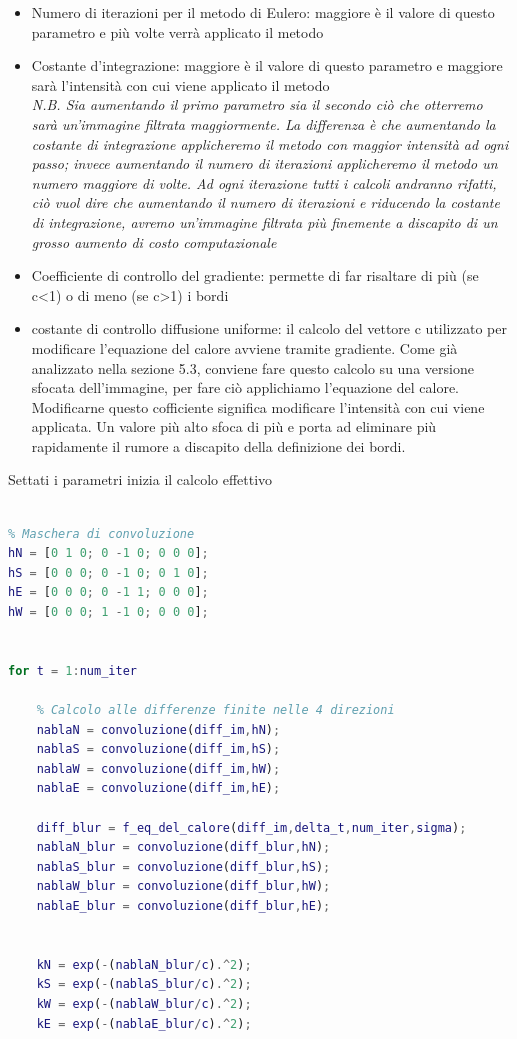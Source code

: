 \begin{itemize}
    \item Numero di iterazioni per il metodo di Eulero: maggiore è il valore di questo parametro e più volte verrà applicato il metodo
    \item Costante d'integrazione: maggiore è il valore di questo parametro e maggiore sarà l'intensità con cui viene applicato il metodo\\
    \vspace{0.25em}
    \textit{N.B. Sia aumentando il primo parametro sia il secondo ciò che otterremo sarà un'immagine filtrata maggiormente. La differenza è che aumentando la costante di integrazione applicheremo il metodo con maggior intensità ad ogni passo; invece aumentando il numero di iterazioni applicheremo il metodo un numero maggiore di volte. 
    Ad ogni iterazione tutti i calcoli andranno rifatti, ciò vuol dire che aumentando il numero di iterazioni e riducendo la costante di integrazione, avremo un'immagine filtrata più finemente a discapito di un grosso aumento di costo computazionale}
    \item Coefficiente di controllo del gradiente: permette di far risaltare di più (se c<1) o di meno (se c>1) i bordi
    \item costante di controllo diffusione uniforme: il calcolo del vettore c utilizzato per modificare l'equazione del calore avviene tramite gradiente. Come già analizzato nella sezione 5.3, conviene fare questo calcolo su una versione sfocata dell'immagine, per fare ciò applichiamo l'equazione del calore. Modificarne questo cofficiente significa modificare l'intensità con cui viene applicata. Un valore più alto sfoca di più e porta ad eliminare più rapidamente il rumore a discapito della definizione dei bordi.
\end{itemize}
Settati i parametri inizia il calcolo effettivo
\begin{lstlisting}[language=MATLAB, name=listato]

% Maschera di convoluzione
hN = [0 1 0; 0 -1 0; 0 0 0];
hS = [0 0 0; 0 -1 0; 0 1 0];
hE = [0 0 0; 0 -1 1; 0 0 0];
hW = [0 0 0; 1 -1 0; 0 0 0];


for t = 1:num_iter
   
    % Calcolo alle differenze finite nelle 4 direzioni
    nablaN = convoluzione(diff_im,hN);
    nablaS = convoluzione(diff_im,hS);   
    nablaW = convoluzione(diff_im,hW);
    nablaE = convoluzione(diff_im,hE);
    
    diff_blur = f_eq_del_calore(diff_im,delta_t,num_iter,sigma);
    nablaN_blur = convoluzione(diff_blur,hN);
    nablaS_blur = convoluzione(diff_blur,hS);   
    nablaW_blur = convoluzione(diff_blur,hW);
    nablaE_blur = convoluzione(diff_blur,hE);


    kN = exp(-(nablaN_blur/c).^2);
    kS = exp(-(nablaS_blur/c).^2);
    kW = exp(-(nablaW_blur/c).^2);
    kE = exp(-(nablaE_blur/c).^2);
\end{lstlisting}
